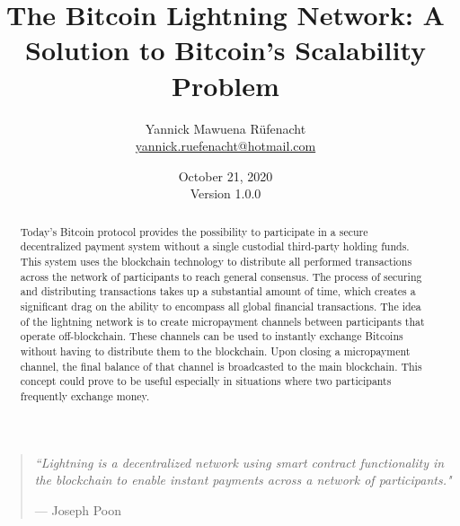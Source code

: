 \documentclass[a4paper, 12pt]{report}
\newcommand{\hsp}{\hspace{20pt}}
\begin{document}
\title{\huge{The Bitcoin Lightning Network: A Solution to Bitcoin's Scalability Problem}}
\author{Yannick Mawuena Rüfenacht \\ \href{mailto:yannick.ruefenacht@hotmail.com}{yannick.ruefenacht@hotmail.com}}
\date{October 21, 2020\\Version 1.0.0}
\maketitle

\begin{quote}
\vspace*{\fill}
\textit{``Lightning is a decentralized network using smart contract functionality in the blockchain to enable instant payments across a network of participants."}
\par\raggedleft--- \textup{Joseph Poon}
\vspace*{\fill}
\end{quote}

\begin{abstract}
Today’s Bitcoin protocol provides the possibility to participate in a secure decentralized payment system without a single custodial third-party holding funds. This system uses the blockchain technology to distribute all performed transactions across the network of participants to reach general consensus. The process of securing and distributing transactions takes up a substantial amount of time, which creates a significant drag on the ability to encompass all global financial transactions. The idea of the lightning network is to create micropayment channels between participants that operate off-blockchain. These channels can be used to instantly exchange Bitcoins without having to distribute them to the blockchain. Upon closing a micropayment channel, the final balance of that channel is broadcasted to the main blockchain. This concept could prove to be useful especially in situations where two participants frequently exchange money.
\end{abstract}

\tableofcontents
\listoffigures

\setlength{\parskip}{1em}
\setlength{\parindent}{0em}
\titleformat{\chapter}[hang]{\LARGE\bfseries}{\thechapter\hsp\textcolor{gray75}{|}\hsp}{0pt}{\LARGE\bfseries}
\titleformat{\section}[hang]{\large\bfseries}{\thesection\hsp\textcolor{gray75}{|}\hsp}{0pt}{\large\bfseries}
\end{document}
